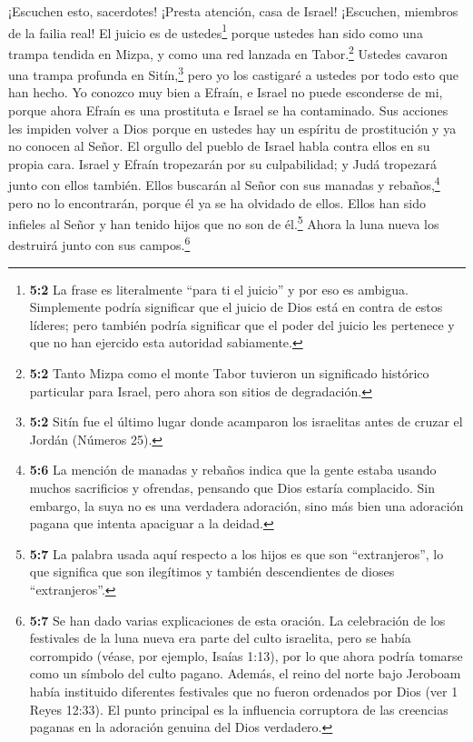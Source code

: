  ¡Escuchen esto, sacerdotes! ¡Presta atención, casa de
Israel! ¡Escuchen, miembros de la failia real!  El juicio es
de ustedes\footnote{\textbf{5:2} La frase es literalmente ``para ti el
  juicio'' y por eso es ambigua. Simplemente podría significar que el
  juicio de Dios está en contra de estos líderes; pero también podría
  significar que el poder del juicio les pertenece y que no han ejercido
  esta autoridad sabiamente.} porque ustedes han sido como una trampa
tendida en Mizpa, y como una red lanzada en Tabor.\footnote{\textbf{5:2}
  Tanto Mizpa como el monte Tabor tuvieron un significado histórico
  particular para Israel, pero ahora son sitios de degradación.} Ustedes
cavaron una trampa profunda en Sitín,\footnote{\textbf{5:2} Sitín fue el
  último lugar donde acamparon los israelitas antes de cruzar el Jordán
  (Números 25).} pero yo los castigaré a ustedes por todo esto que han
hecho.  Yo conozco muy bien a Efraín, e Israel no puede
esconderse de mi, porque ahora Efraín es una prostituta e Israel se ha
contaminado.  Sus acciones les impiden volver a Dios porque
en ustedes hay un espíritu de prostitución y ya no conocen al Señor.
 El orgullo del pueblo de Israel habla contra ellos en su
propia cara. Israel y Efraín tropezarán por su culpabilidad; y Judá
tropezará junto con ellos también.  Ellos buscarán al Señor
con sus manadas y rebaños,\footnote{\textbf{5:6} La mención de manadas y
  rebaños indica que la gente estaba usando muchos sacrificios y
  ofrendas, pensando que Dios estaría complacido. Sin embargo, la suya
  no es una verdadera adoración, sino más bien una adoración pagana que
  intenta apaciguar a la deidad.} pero no lo encontrarán, porque él ya
se ha olvidado de ellos.  Ellos han sido infieles al Señor y
han tenido hijos que no son de él.\footnote{\textbf{5:7} La palabra
  usada aquí respecto a los hijos es que son ``extranjeros'', lo que
  significa que son ilegítimos y también descendientes de dioses
  ``extranjeros''.} Ahora la luna nueva los destruirá junto con sus
campos.\footnote{\textbf{5:7} Se han dado varias explicaciones de esta
  oración. La celebración de los festivales de la luna nueva era parte
  del culto israelita, pero se había corrompido (véase, por ejemplo,
  Isaías 1:13), por lo que ahora podría tomarse como un símbolo del
  culto pagano. Además, el reino del norte bajo Jeroboam había
  instituido diferentes festivales que no fueron ordenados por Dios (ver
  1 Reyes 12:33). El punto principal es la influencia corruptora de las
  creencias paganas en la adoración genuina del Dios verdadero.}

